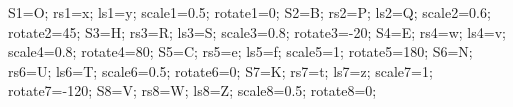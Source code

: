 \documentclass[exercice]{thedocument}%
\begin{document}
%
    \>S1=O;%
    \>rs1=x;%
    \>ls1=y;%
    \>scale1=0.5;%
    \>rotate1=0;%
    \>S2=B;%
    \>rs2=P;%
    \>ls2=Q;%
    \>scale2=0.6;%
    \>rotate2=45;%
    \>S3=H;%
    \>rs3=R;%
    \>ls3=S;%
    \>scale3=0.8;%
    \>rotate3=-20;%
    \>S4=E;%
    \>rs4=w;%
    \>ls4=v;%
    \>scale4=0.8;%
    \>rotate4=80;%
    \>S5=C;%
    \>rs5=e;%
    \>ls5=f;%
    \>scale5=1;%
    \>rotate5=180;%
    \>S6=N;%
    \>rs6=U;%
    \>ls6=T;%
    \>scale6=0.5;%
    \>rotate6=0;%
    \>S7=K;%
    \>rs7=t;%
    \>ls7=z;%
    \>scale7=1;%
    \>rotate7=-120;%
    \>S8=V;%
    \>rs8=W;%
    \>ls8=Z;%
    \>scale8=0.5;%
    \>rotate8=0;%
\end{document}
